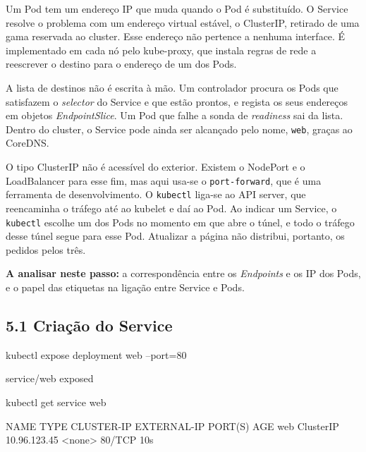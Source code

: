 \documentclass[11pt,a4paper]{article}
\newcommand{\cmd}[1]{\texttt{#1}}
\begin{document}
\begin{teoria}
Um Pod tem um endereço IP que muda quando o Pod é substituído. O Service resolve o problema com um endereço virtual estável, o ClusterIP, retirado de uma gama reservada ao cluster. Esse endereço não pertence a nenhuma interface. É implementado em cada nó pelo kube-proxy, que instala regras de rede a reescrever o destino para o endereço de um dos Pods.

A lista de destinos não é escrita à mão. Um controlador procura os Pods que satisfazem o \emph{selector} do Service e que estão prontos, e regista os seus endereços em objetos \emph{EndpointSlice}. Um Pod que falhe a sonda de \emph{readiness} sai da lista. Dentro do cluster, o Service pode ainda ser alcançado pelo nome, \cmd{web}, graças ao CoreDNS.

O tipo ClusterIP não é acessível do exterior. Existem o NodePort e o LoadBalancer para esse fim, mas aqui usa-se o \cmd{port-forward}, que é uma ferramenta de desenvolvimento. O \cmd{kubectl} liga-se ao API server, que reencaminha o tráfego até ao kubelet e daí ao Pod. Ao indicar um Service, o \cmd{kubectl} escolhe um dos Pods no momento em que abre o túnel, e todo o tráfego desse túnel segue para esse Pod. Atualizar a página não distribui, portanto, os pedidos pelos três.

\textbf{A analisar neste passo:} a correspondência entre os \emph{Endpoints} e os IP dos Pods, e o papel das etiquetas na ligação entre Service e Pods.
\end{teoria}

\subsection*{5.1 Criação do Service}

\begin{terminal}
kubectl expose deployment web --port=80
\end{terminal}

\begin{saida}
service/web exposed
\end{saida}

\begin{terminal}
kubectl get service web
\end{terminal}

\begin{saida}
NAME   TYPE        CLUSTER-IP     EXTERNAL-IP   PORT(S)   AGE
web    ClusterIP   10.96.123.45   <none>        80/TCP    10s
\end{saida}
\end{document}
